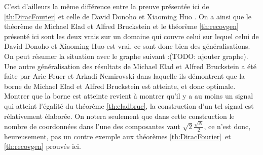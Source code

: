 C'est d'ailleurs la même différence entre la preuve présentée ici de \ref{th:DiracFourier} et celle de David Donoho et Xiaoming Huo \cite{DonohoHuo}.
\newline
On a ainsi que le théorème de Michael Elad et Alfred Bruckstein et le théorème \ref{th:recovgen} présenté ici sont les deux vrais sur un domaine qui couvre celui sur lequel celui de David Donoho et Xiaoming Huo est vrai, ce sont donc bien des généralisations.
On peut résumer la situation avec le graphe suivant :(TODO: ajouter graphe).
\newline
Une autre généralisation des résultats de Michael Elad et Alfred Bruckstein a été faite par Arie Feuer et Arkadi Nemirovski \cite{feuer} dans laquelle ils démontrent que la borne de Michael Elad et Alfred Bruckstein est atteinte, et donc optimale.
Montrer que  la borne est atteinte revient à montrer qu'il y a au moins un signal qui atteint l'égalité du théorème \ref{th:eladbruc}, la construction d'un tel signal est rélativement élaborée. 
On notera seulement que dans cette construction le nombre de coordonnées dans l'une des composantes vaut $\sqrt{2}\frac{\sqrt{N}}{2}$, ce n'est donc, heureusement, pas un contre exemple aux théorèmes \ref{th:DiracFourier} et \ref{th:recovgen} prouvés ici.




